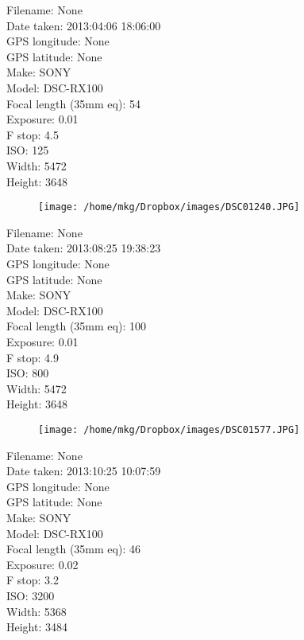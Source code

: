 \clearpage
\recalctypearea
\newpage
\noindent
Filename: None\\ 
Date taken: 2013:04:06 18:06:00\\ 
GPS longitude: None\\ 
GPS latitude: None\\ 
Make: SONY\\ 
Model: DSC-RX100\\ 
Focal length (35mm eq): 54\\ 
Exposure: 0.01\\ 
F stop: 4.5\\ 
ISO: 125\\ 
Width: 5472\\ 
Height: 3648\\ 

\clearpage
\recalctypearea
\newpage
\noindent
\begin{figure}
    \texttt{[image: /home/mkg/Dropbox/images/DSC01240.JPG]}
    \captionlistentry[figure]{\url{\protect\detokenize{}}}
\end{figure}

\clearpage
\recalctypearea
\newpage
\noindent
Filename: None\\ 
Date taken: 2013:08:25 19:38:23\\ 
GPS longitude: None\\ 
GPS latitude: None\\ 
Make: SONY\\ 
Model: DSC-RX100\\ 
Focal length (35mm eq): 100\\ 
Exposure: 0.01\\ 
F stop: 4.9\\ 
ISO: 800\\ 
Width: 5472\\ 
Height: 3648\\ 

\clearpage
\recalctypearea
\newpage
\noindent
\begin{figure}
    \texttt{[image: /home/mkg/Dropbox/images/DSC01577.JPG]}
\end{figure}

\clearpage
\recalctypearea
\newpage
\noindent
Filename: None\\ 
Date taken: 2013:10:25 10:07:59\\ 
GPS longitude: None\\ 
GPS latitude: None\\ 
Make: SONY\\ 
Model: DSC-RX100\\ 
Focal length (35mm eq): 46\\ 
Exposure: 0.02\\ 
F stop: 3.2\\ 
ISO: 3200\\ 
Width: 5368\\ 
Height: 3484\\ 


